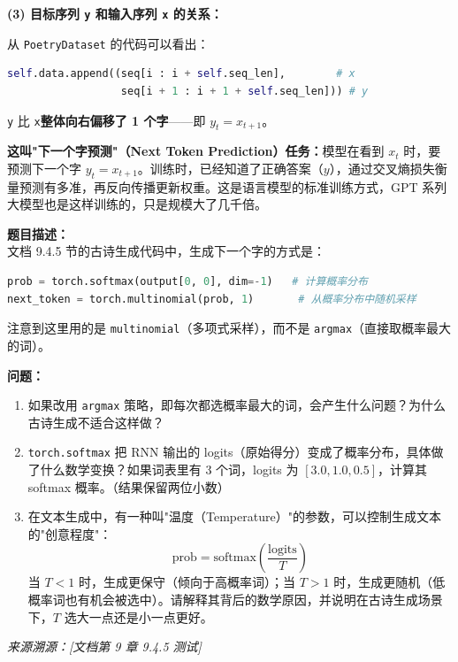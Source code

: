 \documentclass[a4paper,11pt]{ctexart}
\begin{document}
\begin{solutionbox}[参考答案与详细解析]
    \textbf{(3) 目标序列 \texttt{y} 和输入序列 \texttt{x} 的关系：}

    从 \texttt{PoetryDataset} 的代码可以看出：
    \begin{lstlisting}[language=Python]
self.data.append((seq[i : i + self.seq_len],        # x
                  seq[i + 1 : i + 1 + self.seq_len])) # y
    \end{lstlisting}

    \texttt{y} 比 \texttt{x}\textbf{整体向右偏移了 1 个字}——即 $y_t = x_{t+1}$。

    \textbf{这叫"下一个字预测"（Next Token Prediction）任务：}模型在看到 $x_t$ 时，要预测下一个字 $y_t = x_{t+1}$。训练时，已经知道了正确答案（$y$），通过交叉熵损失衡量预测有多准，再反向传播更新权重。这是语言模型的标准训练方式，GPT 系列大模型也是这样训练的，只是规模大了几千倍。
\end{solutionbox}


\begin{problembox}
    \textbf{题目描述：}\\
    文档 9.4.5 节的古诗生成代码中，生成下一个字的方式是：
    \begin{lstlisting}[language=Python]
prob = torch.softmax(output[0, 0], dim=-1)   # 计算概率分布
next_token = torch.multinomial(prob, 1)       # 从概率分布中随机采样
    \end{lstlisting}

    注意到这里用的是 \texttt{multinomial}（多项式采样），而不是 \texttt{argmax}（直接取概率最大的词）。

    \vspace{0.2cm}
    \textbf{问题：}
    \begin{enumerate}[(1)]
        \item 如果改用 \texttt{argmax} 策略，即每次都选概率最大的词，会产生什么问题？为什么古诗生成不适合这样做？
        \item \texttt{torch.softmax} 把 RNN 输出的 logits（原始得分）变成了概率分布，具体做了什么数学变换？如果词表里有 3 个词，logits 为 $[3.0, 1.0, 0.5]$，计算其 softmax 概率。（结果保留两位小数）
        \item 在文本生成中，有一种叫"温度（Temperature）"的参数，可以控制生成文本的"创意程度"：
        \[
        \text{prob} = \text{softmax}\!\left(\frac{\text{logits}}{T}\right)
        \]
        当 $T < 1$ 时，生成更保守（倾向于高概率词）；当 $T > 1$ 时，生成更随机（低概率词也有机会被选中）。请解释其背后的数学原因，并说明在古诗生成场景下，$T$ 选大一点还是小一点更好。
    \end{enumerate}

    \vspace{0.2cm}
    {\color{gray}\small\textit{来源溯源：[文档第 9 章 9.4.5 测试]}}
\end{problembox}
\end{document}
